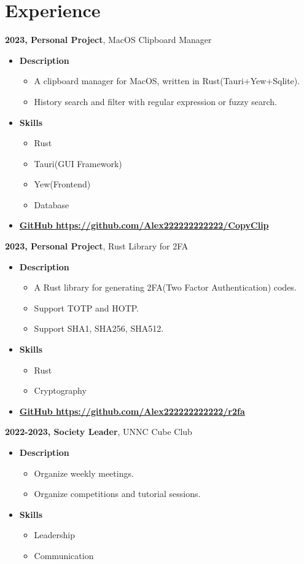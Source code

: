 \documentclass{article}
\begin{document}
\section*{Experience}
\textbf{2023, Personal Project}, MacOS Clipboard Manager
\begin{itemize}
    \item \textbf{Description}
    \begin{itemize}
        \item A clipboard manager for MacOS, written in Rust(Tauri+Yew+Sqlite).
        \item History search and filter with regular expression or fuzzy search.
    \end{itemize}
    \item \textbf{Skills}
    \begin{itemize}
        \item Rust
        \item Tauri(GUI Framework)
        \item Yew(Frontend)
        \item Database
    \end{itemize}
    \item \textbf{\href{https://github.com/Alex222222222222/CopyClip}{GitHub https://github.com/Alex222222222222/CopyClip}}
\end{itemize}
\textbf{2023, Personal Project}, Rust Library for 2FA
\begin{itemize}
    \item \textbf{Description}
    \begin{itemize}
        \item A Rust library for generating 2FA(Two Factor Authentication) codes.
        \item Support TOTP and HOTP.
        \item Support SHA1, SHA256, SHA512.
    \end{itemize}
    \item \textbf{Skills}
    \begin{itemize}
        \item Rust
        \item Cryptography
    \end{itemize}
    \item \textbf{\href{https://github.com/Alex222222222222/r2fa}{GitHub https://github.com/Alex222222222222/r2fa}}
\end{itemize}
\textbf{2022-2023, Society Leader}, UNNC Cube Club
\begin{itemize}
    \item \textbf{Description}
    \begin{itemize}
        \item Organize weekly meetings.
        \item Organize competitions and tutorial sessions.
    \end{itemize}
    \item \textbf{Skills}
    \begin{itemize}
        \item Leadership
        \item Communication
    \end{itemize}
\end{itemize}
\end{document}
